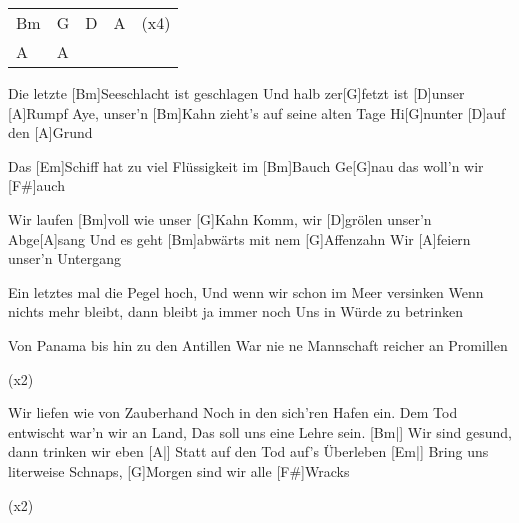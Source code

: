 

\begin{guitar}
	{\footnotesize\begin{tabular}{l|l|l|l|l}
			Bm & G & D & A & (x4) \\
			A  & A &  & &
	\end{tabular}}
	
	Die letzte [Bm]Seeschlacht ist geschlagen
	Und halb zer[G]fetzt ist [D]unser [A]Rumpf
	Aye, unser'n [Bm]Kahn zieht's auf seine alten Tage
	Hi[G]nunter [D]auf den [A]Grund
	
	Das [Em]Schiff hat zu viel Flüssigkeit im [Bm]Bauch
	Ge[G]nau das woll'n wir [F#]auch
	
	Wir laufen [Bm]voll wie unser [G]Kahn
	Komm, wir [D]grölen unser'n Abge[A]sang
	Und es geht [Bm]abwärts mit nem [G]Affenzahn
	Wir [A]feiern unser'n Untergang
	
	
	Ein letztes mal die Pegel hoch,
	Und wenn wir schon im Meer versinken
	Wenn nichts mehr bleibt, dann bleibt ja immer noch
	Uns in Würde zu betrinken
	
	Von Panama bis hin zu den Antillen
	War nie ne Mannschaft reicher an Promillen
	
	 (x2)
	
	\pagebreak
	
	Wir liefen wie von Zauberhand
	Noch in den sich'ren Hafen ein.
	Dem Tod entwischt war'n wir an Land,
	Das soll uns eine Lehre sein.
	[Bm|] Wir sind gesund, dann trinken wir eben
	[A|] Statt auf den Tod auf's Überleben
	[Em|] Bring uns literweise Schnaps,
	[G]Morgen sind wir alle [F#]Wracks
	
	 (x2)
	
\end{guitar}